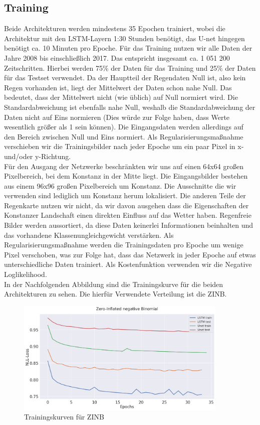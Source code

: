 \subsection{Training} \label{sec:Training}
Beide Architekturen werden mindestens 35 Epochen trainiert, wobei die Architektur mit den LSTM-Layern 1:30 Stunden benötigt, das U-net hingegen benötigt ca. 10 Minuten pro Epoche.
Für das Training nutzen wir alle Daten der Jahre 2008 bis einschließlich 2017. Das entspricht insgesamt ca. 1 051 200 Zeitschritten. Hierbei werden 75\% der Daten für das Training und 25\% der Daten für das Testset verwendet.
Da der Hauptteil der Regendaten Null ist, also kein Regen vorhanden ist, liegt der Mittelwert der Daten schon nahe Null. Das bedeutet, dass der Mittelwert nicht (wie üblich) auf Null normiert wird.
Die Standardabweichung ist ebenfalls nahe Null, weshalb die Standardabweichung der Daten nicht auf Eins normieren (Dies würde zur Folge haben, dass Werte wesentlich größer als 1 sein können). 
Die Eingangsdaten werden allerdings auf den Bereich zwischen Null und Eins normiert. Als Regularisierungsmaßnahme verschieben wir die Trainingsbilder nach jeder Epoche um ein paar Pixel in x- und/oder y-Richtung.\\

\noindent Für den Ausgang der Netzwerke beschränkten wir uns auf einen 64x64 großen Pixelbereich, bei dem Konstanz in der Mitte liegt. Die Eingangsbilder bestehen aus einem 96x96 großen Pixelbereich um Konstanz. Die Ausschnitte die wir verwenden sind lediglich um Konstanz herum lokalisiert. Die anderen Teile der Regenkarte nutzen wir nicht, da wir davon ausgehen dass die Eigenschaften der Konstanzer Landschaft einen direkten Einfluss auf das Wetter haben. Regenfreie Bilder werden aussortiert, da diese Daten keinerlei Informationen beinhalten und das vorhandene Klassenungleichgewicht verstärken. Als Regularisierungsmaßnahme werden die Trainingsdaten pro Epoche um wenige Pixel verschoben, was zur Folge hat, dass das Netzwerk in jeder Epoche auf etwas unterschiedliche Daten trainiert. Als Kostenfunktion verwenden wir die Negative Loglikelihood.
\\

\noindent In der Nachfolgenden Abbildung sind die Trainingskurve für die beiden Architekturen zu sehen. Die hierfür Verwendete Verteilung ist die ZINB.

\begin{figure}[htb]
 \centering
 \includegraphics[width=0.9\textwidth,angle=0]{abb/Loss_zinfBinom.png}
 \caption{Trainingskurven für ZINB}
\label{fig:Inception-Conv-LSTM}
\end{figure}

